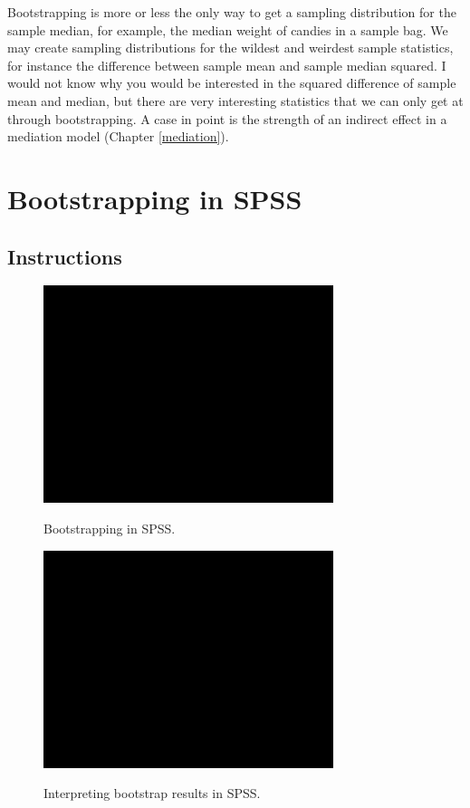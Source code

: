 \documentclass[a4paper]{book}
\theoremstyle{definition}
\theoremstyle{definition}
\theoremstyle{definition}
\theoremstyle{remark}
\begin{document}
Bootstrapping is more or less the only way to get a sampling
distribution for the sample median, for example, the median weight of
candies in a sample bag. We may create sampling distributions for the
wildest and weirdest sample statistics, for instance the difference
between sample mean and sample median squared. I would not know why you
would be interested in the squared difference of sample mean and median,
but there are very interesting statistics that we can only get at
through bootstrapping. A case in point is the strength of an indirect
effect in a mediation model (Chapter \ref{mediation}).

\section{Bootstrapping in SPSS}\label{boot-spss}

\subsection{Instructions}\label{instructions}

\begin{figure}[H]
\href{https://www.youtube.com/embed/6-MtiMhuuIg}{\includegraphics[width=320px]{GentleIntro_files/figure-latex/SPSSbootstrap1-1} }\caption{Bootstrapping in SPSS.}\label{fig:SPSSbootstrap1}
\end{figure}

\begin{figure}[H]
\href{https://www.youtube.com/embed/6E2LgeMtkL4}{\includegraphics[width=320px]{GentleIntro_files/figure-latex/SPSSbootstrap2-1} }\caption{Interpreting bootstrap results in SPSS.}\label{fig:SPSSbootstrap2}
\end{figure}
\end{document}
